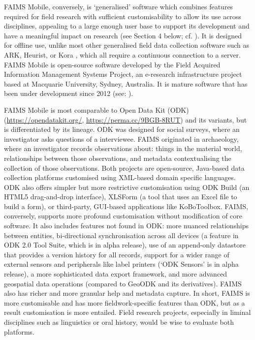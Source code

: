 \documentclass[preprint,12pt, a4paper]{elsarticle}
\begin{document}
FAIMS Mobile, conversely, is `generalised' software which combines features required for field research with sufficient customisability to allow its use across disciplines, appealing to a large enough user base to support its development and have a meaningful impact on research (see Section 4 below; cf. \cite{Sobotkova2016-mx}). It is designed for offline use, unlike most other generalised field data collection software such as ARK, Heurist, or Kora \cite{Gordon2016-xf}, which all require a continuous connection to a server. FAIMS Mobile is open-source software developed by the Field Acquired Information Management Systems Project, an e-research infrastructure project based at Macquarie University, Sydney, Australia. It is mature software that has been under development since 2012 (see: \cite{Ross2015-mo, Ross2013-dz, Sobotkova2015-lq}). 

FAIMS Mobile is most comparable to Open Data Kit (ODK) (\url{https://opendatakit.org/}, \url{https://perma.cc/9BGB-8RUT}) and its variants, but is differentiated by its lineage. ODK was designed for social surveys, where an investigator asks questions of a interviewee. FAIMS originated in archaeology, where an investigator records observations about: things in the material world, relationships between those observations, and metadata contextualising the collection of those observations. Both projects are open-source, Java-based data collection platforms customised using XML-based domain specific languages. ODK also offers simpler but more restrictive customisation using ODK Build (an HTML5 drag-and-drop interface), XLSForm (a tool that uses an Excel file to build a form), or third-party, GUI-based applications like KoBoToolbox. FAIMS, conversely, supports more profound customisation without modification of core software. It also includes features not found in ODK: more nuanced relationships between entities, bi-directional synchronisation across all devices (a feature in ODK 2.0 Tool Suite, which is in alpha release), use of an append-only datastore that provides a version history for all records, support for a wider range of external sensors and peripherals like label printers (`ODK Sensors' is in alpha release), a more sophisticated data export framework, and more advanced geospatial data operations (compared to GeoODK and its derivatives). FAIMS also has richer and more granular help and metadata capture. In short, FAIMS is more customisable and has more fieldwork-specific features than ODK, but as a result customisation is more entailed. Field research projects, especially in liminal disciplines such as linguistics or oral history, would be wise to evaluate both platforms.
\end{document}
